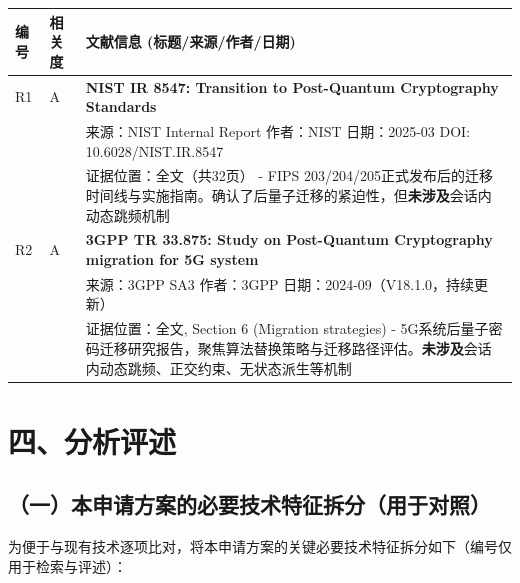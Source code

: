 ﻿\documentclass[12pt,a4paper]{article}
\begin{document}
\begingroup
{}
\small
\renewcommand{\arraystretch}{1.2}
\begin{longtable}{|p{1.2cm}|p{1.8cm}|p{11.0cm}|}
\hline
\textbf{编号} & \textbf{相关度} & \textbf{文献信息 (标题/来源/作者/日期)} \\
\hline

R1 & A & \textbf{NIST IR 8547: Transition to Post-Quantum Cryptography Standards} \\
& & 来源：NIST Internal Report \quad 作者：NIST \quad 日期：2025-03 \quad DOI: 10.6028/NIST.IR.8547 \\
& & 证据位置：全文（共32页） - FIPS 203/204/205正式发布后的迁移时间线与实施指南。确认了后量子迁移的紧迫性，但\textbf{未涉及}会话内动态跳频机制 \\
\hline
R2 & A & \textbf{3GPP TR 33.875: Study on Post-Quantum Cryptography migration for 5G system} \\
& & 来源：3GPP SA3 \quad 作者：3GPP \quad 日期：2024-09（V18.1.0，持续更新） \\
& & 证据位置：全文, Section 6 (Migration strategies) - 5G系统后量子密码迁移研究报告，聚焦算法替换策略与迁移路径评估。\textbf{未涉及}会话内动态跳频、正交约束、无状态派生等机制 \\
\hline
\end{longtable}
\endgroup

\vspace{0.5em}

\section*{四、分析评述}

\subsection*{（一）本申请方案的必要技术特征拆分（用于对照）}

为便于与现有技术逐项比对，将本申请方案的关键必要技术特征拆分如下（编号仅用于检索与评述）：
\end{document}

